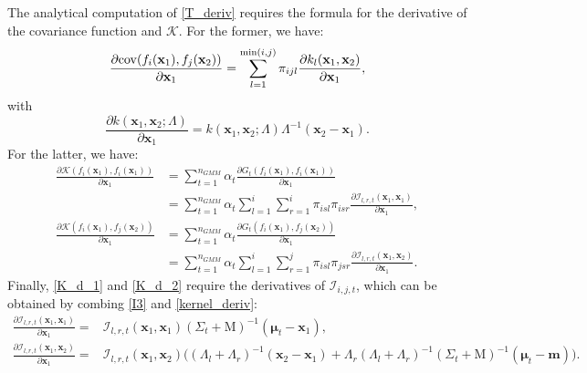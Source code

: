 \documentclass[11pt]{article}
\begin{document}
The analytical computation of \eqref{T_deriv} requires the formula for the derivative of the covariance function and $\mathcal{K}$. For the former, we have:
\begin{align}
    \frac{\partial {\rm{cov}}(f_i(\mathbf{x}_1), f_j(\mathbf{x}_2))}{\partial \mathbf{x}_1} = \sum_{l=1}^{\min(i,j)} \pi_{ijl} \frac{\partial k_l(\mathbf{x}_1, \mathbf{x}_2)}{\partial \mathbf{x}_1},
\end{align}
with 
\begin{equation}
    \frac{\partial k(\mathbf{x}_1, \mathbf{x}_2;\Lambda)}{\partial \mathbf{x}_1} = k(\mathbf{x}_1, \mathbf{x}_2;\Lambda)\Lambda^{-1} (\mathbf{x}_2- \mathbf{x}_1) .
\label{kernel_deriv}
\end{equation}
For the latter, we have:
\begin{align}
    \frac{\partial \mathcal{K}(f_i(\mathbf{x}_1), f_i(\mathbf{x}_1)) }{ \partial \mathbf{x}_1} 
    & = \sum_{t=1}^{n_{GMM}} \alpha_t \frac{\partial G_{t}(f_i(\mathbf{x}_1), f_i(\mathbf{x}_1))}{\partial \mathbf{x}_1}
\nonumber \\
    & = \sum_{t=1}^{n_{GMM}} \alpha_t \sum_{l=1}^{i} \sum_{r=1}^{i}  \pi_{isl}  \pi_{isr} \frac{\partial \mathcal{I}_{l,r,t}(\mathbf{x}_1, \mathbf{x}_1)}{\partial \mathbf{x}_1},
\label{K_d_1} \\
     \frac{\partial \mathcal{K}(f_i(\mathbf{x}_1), f_j(\mathbf{x}_2)) }{ \partial \mathbf{x}_1} 
     & = \sum_{t=1}^{n_{GMM}} \alpha_t  \frac{\partial G_{t}(f_i(\mathbf{x}_1), f_j(\mathbf{x}_2))}{\partial \mathbf{x}_1}
\nonumber \\ 
     & = \sum_{t=1}^{n_{GMM}} \alpha_t \sum_{l=1}^{i} \sum_{r=1}^{j}  \pi_{isl}  \pi_{jsr} \frac{\partial \mathcal{I}_{l,r,t}(\mathbf{x}_1, \mathbf{x}_2)}{\partial \mathbf{x}_1}.
\label{K_d_2}
\end{align}
Finally, \eqref{K_d_1} and \eqref{K_d_2} require the derivatives of $\mathcal{I}_{i,j,t}$, which can be obtained by combing \eqref{I3} and \eqref{kernel_deriv}:
\begin{align}
    \frac{\partial \mathcal{I}_{l,r,t}(\mathbf{x}_1, \mathbf{x}_1)}{\partial \mathbf{x}_1} = &  \mathcal{I}_{l,r,t}(\mathbf{x}_1, \mathbf{x}_1) 
    (\Sigma_t + \mathrm{M})^{-1}(\mathbf{\mu}_t - \mathbf{x}_1),
\\
        \frac{\partial \mathcal{I}_{l,r,t}(\mathbf{x}_1, \mathbf{x}_2)}{\partial \mathbf{x}_1} = &  \mathcal{I}_{l,r,t}(\mathbf{x}_1, \mathbf{x}_2) 
    \Big((\Lambda_l + \Lambda_r)^{-1}(\mathbf{x}_2-\mathbf{x}_1)
    + \Lambda_r(\Lambda_l+\Lambda_r)^{-1}(\Sigma_t + \mathrm{M})^{-1}(\mathbf{\mu}_t - \mathbf{m})
    \Big).
\end{align}
\end{document}
